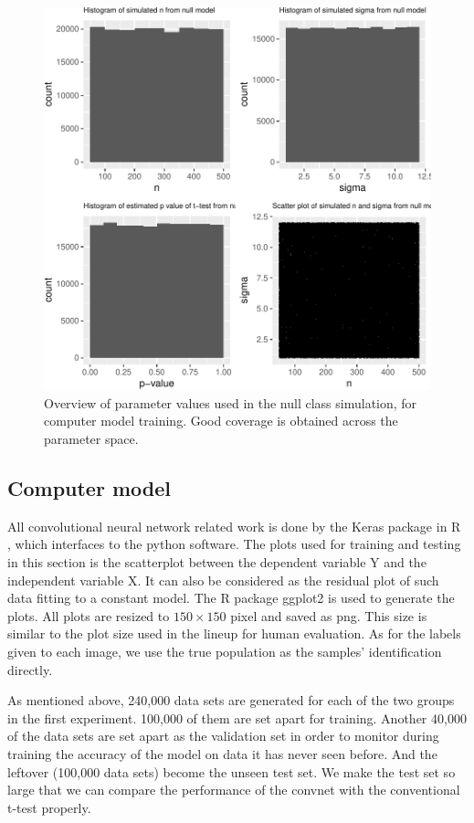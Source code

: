 \documentclass[12pt]{article}
\begin{document}
\begin{figure}
\centering
\includegraphics{pc_plots_files/figure-latex/simp-1.pdf}
\caption{Overview of parameter values used in the null class simulation,
for computer model training. Good coverage is obtained across the
parameter space.}
\end{figure}

\subsection{Computer model}\label{computer-model}

All convolutional neural network related work is done by the Keras
\citep{keras} package in R \citep{R}, which interfaces to the python
software. The plots used for training and testing in this section is the
scatterplot between the dependent variable Y and the independent
variable X. It can also be considered as the residual plot of such data
fitting to a constant model. The R package ggplot2 \citep{ggplot2} is
used to generate the plots. All plots are resized to \(150\times 150\)
pixel and saved as png. This size is similar to the plot size used in
the lineup for human evaluation. As for the labels given to each image,
we use the true population as the samples' identification directly.

As mentioned above, 240,000 data sets are generated for each of the two
groups in the first experiment. 100,000 of them are set apart for
training. Another 40,000 of the data sets are set apart as the
validation set in order to monitor during training the accuracy of the
model on data it has never seen before. And the leftover (100,000 data
sets) become the unseen test set. We make the test set so large that we
can compare the performance of the convnet with the conventional t-test
properly.
\end{document}
